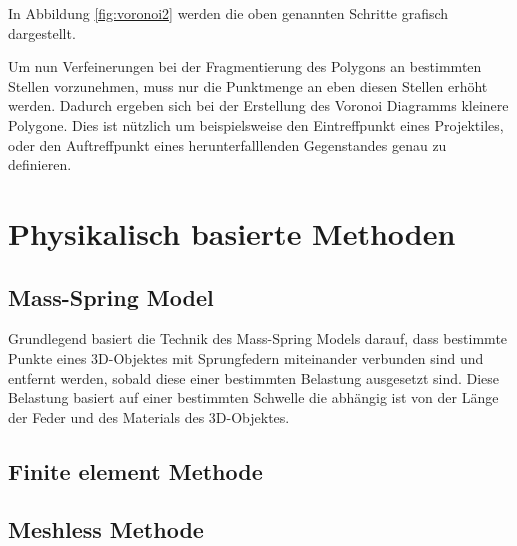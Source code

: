 In Abbildung \ref{fig:voronoi2} werden die oben genannten Schritte grafisch dargestellt.

Um nun Verfeinerungen bei der Fragmentierung des Polygons an bestimmten Stellen vorzunehmen, muss nur die Punktmenge an eben diesen Stellen erhöht werden. Dadurch ergeben
sich bei der Erstellung des Voronoi Diagramms kleinere Polygone. Dies ist nützlich um beispielsweise den Eintreffpunkt eines Projektiles, oder 
den Auftreffpunkt eines herunterfalllenden Gegenstandes genau zu definieren. 






\section{Physikalisch basierte Methoden}


\subsection{Mass-Spring Model}

Grundlegend basiert die Technik des Mass-Spring Models darauf, dass bestimmte Punkte eines 3D-Objektes mit Sprungfedern miteinander verbunden sind und entfernt werden, 
sobald diese einer bestimmten Belastung ausgesetzt sind. 
Diese Belastung basiert auf einer bestimmten Schwelle die abhängig ist von der Länge der Feder und des Materials des 3D-Objektes. 




\subsection{Finite element Methode}

\subsection{Meshless Methode}